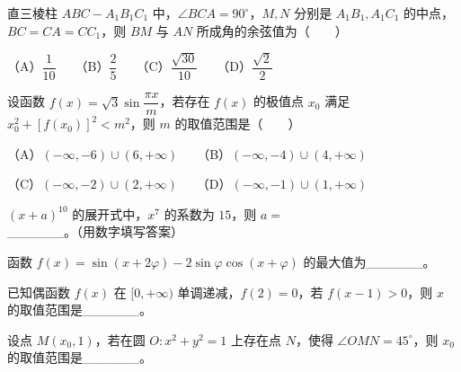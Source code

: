 \begin{question}
直三棱柱 $ABC-A_1B_1C_1$ 中，$\angle BCA=90^\circ$，$M,N$ 分别是 $A_1B_1,A_1C_1$ 的中点，$BC=CA=CC_1$，则 $BM$ 与 $AN$ 所成角的余弦值为\mbox{（　　）}

（A）$\dfrac1{10}$　　（B）$\dfrac25$　　（C）$\dfrac{\sqrt{30}}{10}$　　（D）$\dfrac{\sqrt2}{2}$

\end{question}
\begin{question}
设函数 $f(x)=\sqrt3\sin\dfrac{\pi x}{m}$，若存在 $f(x)$ 的极值点 $x_0$ 满足 $x_0^2+[f(x_0)]^2<m^2$，则 $m$ 的取值范围是\mbox{（　　）}

（A）$(-\infty,-6)\cup(6,+\infty)$　　（B）$(-\infty,-4)\cup(4,+\infty)$

（C）$(-\infty,-2)\cup(2,+\infty)$　　（D）$(-\infty,-1)\cup(1,+\infty)$

\end{question}

\begin{question}
$(x+a)^{10}$ 的展开式中，$x^7$ 的系数为 $15$，则 $a=$______。（用数字填写答案）

\end{question}
\begin{question}
函数 $f(x)=\sin(x+2\varphi)-2\sin\varphi\cos(x+\varphi)$ 的最大值为______。

\end{question}
\begin{question}
已知偶函数 $f(x)$ 在 $[0,+\infty)$ 单调递减，$f(2)=0$，若 $f(x-1)>0$，则 $x$ 的取值范围是______。

\end{question}
\begin{question}
设点 $M(x_0,1)$，若在圆 $O:x^2+y^2=1$ 上存在点 $N$，使得 $\angle OMN=45^\circ$，则 $x_0$ 的取值范围是______。

\end{question}

